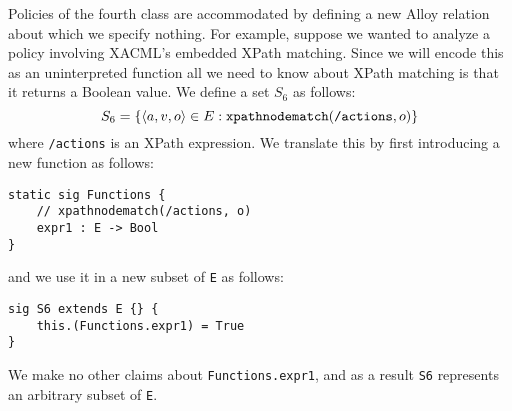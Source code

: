 Policies of the fourth class are accommodated by defining a new Alloy
relation about which we specify nothing.  For example, suppose we
wanted to analyze a policy involving XACML's embedded XPath matching.
Since we will encode this as an uninterpreted function all we need to
know about XPath matching is that it returns a Boolean value. We
define a set $S_6$ as follows:
\begin{equation*}
  S_6 = \{ \langle a, v, o \rangle \in E : \text{\texttt{xpathnodematch}}
  (\text{\texttt{/actions}}, o) \}
\end{equation*}
where {\tt /actions} is an XPath expression.  We translate this by
first introducing a new function as follows:
\begin{verbatim}
static sig Functions {
    // xpathnodematch(/actions, o)
    expr1 : E -> Bool
}
\end{verbatim}
and we use it in a new subset of \texttt{E} as follows:
\begin{verbatim}
sig S6 extends E {} {
    this.(Functions.expr1) = True
}
\end{verbatim}

We make no other claims about \texttt{Functions.expr1}, and as a
result \texttt{S6} represents an arbitrary subset of \texttt{E}.


